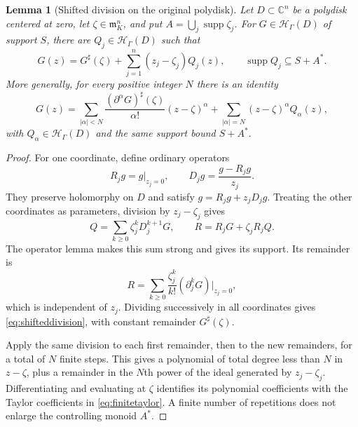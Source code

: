 \documentclass[11pt,letterpaper]{article}
\newtheorem{lemma}[theorem]{Lemma}
\theoremstyle{definition}
\theoremstyle{remark}
\newcommand{\C}{\mathbb C}
\newcommand{\HH}{\mathcal H}
\newcommand{\mm}{\mathfrak m}
\newcommand{\supp}{\operatorname{supp}}
\newcommand{\sh}{^{\sharp}}
\newcommand{\Hh}{\HH_{\Gamma}}
\begin{document}
\begin{lemma}[Shifted division on the original polydisk]\label{lem:shifted}
Let $D\subset\C^n$ be a polydisk centered at zero, let $\zeta\in\mm_K^n$, and put $A=\bigcup_j\supp\zeta_j$. For $G\in\Hh(D)$ of support $S$, there are $Q_j\in\Hh(D)$ such that
\begin{equation}\label{eq:shifteddivision}
 G(z)=G\sh(\zeta)+\sum_{j=1}^{n}(z_j-\zeta_j)Q_j(z),
 \qquad \supp Q_j\subseteq S+A^*.
\end{equation}
More generally, for every positive integer $N$ there is an identity
\begin{equation}\label{eq:finitetaylor}
 G(z)=\sum_{|\alpha|<N}
   \frac{(\partial^\alpha G)\sh(\zeta)}{\alpha!}(z-\zeta)^\alpha
       +\sum_{|\alpha|=N}(z-\zeta)^\alpha Q_\alpha(z),
\end{equation}
with $Q_\alpha\in\Hh(D)$ and the same support bound $S+A^*$.
\end{lemma}
\begin{proof}
For one coordinate, define ordinary operators
\[
 R_jg=g|_{z_j=0},\qquad D_jg=\frac{g-R_jg}{z_j}.
\]
They preserve holomorphy on $D$ and satisfy $g=R_jg+z_jD_jg$. Treating the other coordinates as parameters, division by $z_j-\zeta_j$ gives
\[
 Q=\sum_{k\geq0}\zeta_j^kD_j^{k+1}G,
 \qquad R=R_jG+\zeta_jR_jQ.
\]
The operator lemma makes this sum strong and gives its support. Its remainder is
\[
 R=\sum_{k\geq0}\frac{\zeta_j^k}{k!}
       (\partial_j^kG)|_{z_j=0},
\]
which is independent of $z_j$. Dividing successively in all coordinates gives \eqref{eq:shifteddivision}, with constant remainder $G\sh(\zeta)$.

Apply the same division to each first remainder, then to the new remainders, for a total of $N$ finite steps. This gives a polynomial of total degree less than $N$ in $z-\zeta$, plus a remainder in the $N$th power of the ideal generated by $z_j-\zeta_j$. Differentiating and evaluating at $\zeta$ identifies its polynomial coefficients with the Taylor coefficients in \eqref{eq:finitetaylor}. A finite number of repetitions does not enlarge the controlling monoid $A^*$.
\end{proof}
\end{document}
